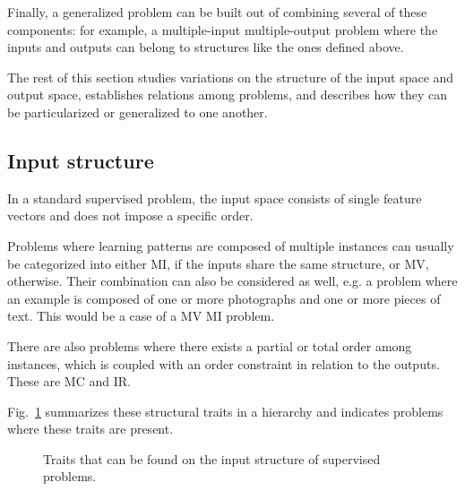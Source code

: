 \documentclass[
	fontsize=11pt, %
	twoside=false, %
	open=any, %
	secnumdepth=1, %
]{kaobook}
\begin{document}
Finally, a generalized problem can be built out of combining several of these components: for example, a multiple-input multiple-output problem where the inputs and outputs can belong to structures like the ones defined above.

The rest of this section studies variations on the structure of the input space and output space, establishes relations among problems, and describes how they can be particularized or generalized to one another.

\subsection{Input structure}
\label{sec:multiinput}

In a standard supervised problem, the input space consists of single feature vectors and does not impose a specific order.

Problems where learning patterns are composed of multiple instances can usually be categorized into either MI, if the inputs share the same structure, or MV, otherwise. Their combination can also be considered as well, e.g. a problem where an example is composed of one or more photographs and one or more pieces of text. This would be a case of a MV MI problem.

There are also problems where there exists a partial or total order among instances, which is coupled with an order constraint in relation to the outputs. These are MC and IR.

Fig.~\ref{fig.minputstr} summarizes these structural traits in a hierarchy and indicates problems where these traits are present.

\begin{figure}[ht]
\centering\scriptsize
{}
\caption{\label{fig.minputstr}Traits that can be found on the input structure of supervised problems.}
\end{figure}
\end{document}
